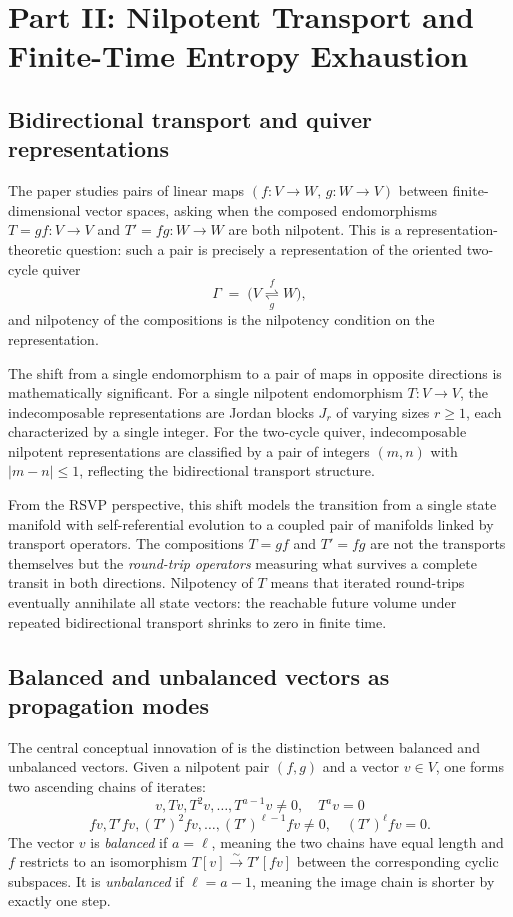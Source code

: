 \documentclass[12pt, a4paper]{article}
\theoremstyle{plain}
\theoremstyle{definition}
\theoremstyle{correspondence}
\begin{document}
\section{Part II: Nilpotent Transport and Finite-Time Entropy Exhaustion}

\subsection{Bidirectional transport and quiver representations}

The paper \cite{CIKLR25} studies pairs of linear maps $(f : V \to W,\, g : W \to V)$
between finite-dimensional vector spaces, asking when the composed endomorphisms
$T = gf : V \to V$ and $T' = fg : W \to W$ are both nilpotent. This is a representation-
theoretic question: such a pair is precisely a representation of the oriented two-cycle
quiver
\[
\Gamma \;=\; \bigl( V \underset{g}{\overset{f}{\rightleftharpoons}} W \bigr),
\]
and nilpotency of the compositions is the nilpotency condition on the representation.

The shift from a single endomorphism to a pair of maps in opposite directions is
mathematically significant. For a single nilpotent endomorphism $T : V \to V$, the
indecomposable representations are Jordan blocks $J_r$ of varying sizes $r \geq 1$,
each characterized by a single integer. For the two-cycle quiver, indecomposable
nilpotent representations are classified by a pair of integers $(m,n)$ with $|m-n| \leq 1$,
reflecting the bidirectional transport structure.

From the RSVP perspective, this shift models the transition from a single state manifold
with self-referential evolution to a coupled pair of manifolds linked by transport
operators. The compositions $T = gf$ and $T' = fg$ are not the transports themselves
but the \emph{round-trip operators} measuring what survives a complete transit in both
directions. Nilpotency of $T$ means that iterated round-trips eventually annihilate all
state vectors: the reachable future volume under repeated bidirectional transport
shrinks to zero in finite time.

\subsection{Balanced and unbalanced vectors as propagation modes}

The central conceptual innovation of \cite{CIKLR25} is the distinction between balanced
and unbalanced vectors. Given a nilpotent pair $(f,g)$ and a vector $v \in V$, one
forms two ascending chains of iterates:
\[
v, Tv, T^2 v, \ldots, T^{a-1}v \neq 0, \quad T^a v = 0
\]
\[
fv, T'fv, (T')^2 fv, \ldots, (T')^{\ell-1}fv \neq 0, \quad (T')^\ell fv = 0.
\]
The vector $v$ is \emph{balanced} if $a = \ell$, meaning the two chains have equal
length and $f$ restricts to an isomorphism $T[v] \xrightarrow{\sim} T'[fv]$ between the
corresponding cyclic subspaces. It is \emph{unbalanced} if $\ell = a - 1$, meaning the
image chain is shorter by exactly one step.
\end{document}
